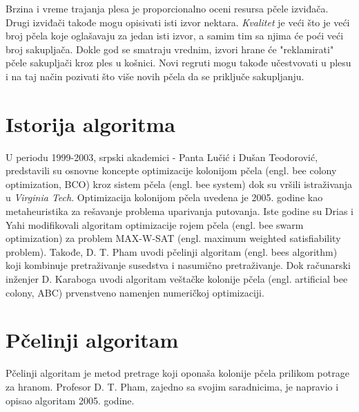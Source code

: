 \documentclass[a4paper]{article}
\begin{document}
{Brzina i vreme trajanja plesa je proporcionalno oceni resursa pčele izviđača. Drugi izviđači takođe mogu opisivati isti izvor nektara. {\em Kvalitet} je veći što je veći broj pčela koje oglašavaju za jedan isti izvor, a samim tim sa njima će poći veći broj sakupljača\cite{bcoalg}. Dokle god se smatraju vrednim, izvori hrane će "reklamirati" pčele sakupljači kroz ples u košnici. Novi regruti mogu takođe učestvovati u plesu i na taj način pozivati što više novih pčela da se priključe sakupljanju. 

\section{Istorija algoritma}
U periodu 1999-2003, srpski akademici - Panta Lučić i Dušan Teodorović, predstavili su osnovne koncepte optimizacije kolonijom pčela (engl. bee colony optimization, BCO) kroz sistem pčela (engl. bee system) dok su vršili istraživanja u {\em Virginia Tech}\cite{algoritam}. Optimizacija kolonijom pčela uvedena je 2005. godine kao metaheuristika za rešavanje problema uparivanja putovanja. Iste godine su Drias i
Yahi modifikovali algoritam optimizacije rojem pčela (engl. bee swarm optimization) za
problem MAX-W-SAT (engl. maximum weighted satisfiability problem). Takođe, D. T. Pham uvodi pčelinji algoritam (engl. bees algorithm) koji kombinuje
pretraživanje susedstva i nasumično pretraživanje.\cite{istorijat} Dok računarski inženjer D. Karaboga uvodi algoritam veštačke kolonije pčela (engl. artificial bee colony, ABC) prvenstveno
namenjen numeričkoj optimizaciji.


\section{Pčelinji algoritam}
Pčelinji algoritam je metod pretrage koji oponaša kolonije pčela prilikom potrage za hranom\cite{sajt_algoritma}. Profesor D. T. Pham, zajedno sa svojim saradnicima, je napravio i opisao algoritam 2005. godine.

}
\end{document}
